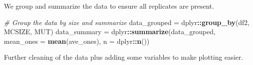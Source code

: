 \documentclass[]{book}
\newenvironment{Shaded}{\begin{snugshade}}{\end{snugshade}}
\newcommand{\CommentTok}[1]{\textcolor[rgb]{0.56,0.35,0.01}{\textit{#1}}}
\newcommand{\DataTypeTok}[1]{\textcolor[rgb]{0.13,0.29,0.53}{#1}}
\newcommand{\KeywordTok}[1]{\textcolor[rgb]{0.13,0.29,0.53}{\textbf{#1}}}
\newcommand{\NormalTok}[1]{#1}
\newcommand{\OperatorTok}[1]{\textcolor[rgb]{0.81,0.36,0.00}{\textbf{#1}}}
\newcommand{\StringTok}[1]{\textcolor[rgb]{0.31,0.60,0.02}{#1}}
\begin{document}
We group and summarize the data to ensure all replicates are present.

\begin{Shaded}
\begin{Highlighting}[]
\CommentTok{# Group the data by size and summarize}
\NormalTok{data_grouped =}\StringTok{ }\NormalTok{dplyr}\OperatorTok{::}\KeywordTok{group_by}\NormalTok{(df2, MCSIZE, MUT)}
\NormalTok{data_summary =}\StringTok{ }\NormalTok{dplyr}\OperatorTok{::}\KeywordTok{summarize}\NormalTok{(data_grouped, }\DataTypeTok{mean_ones =} \KeywordTok{mean}\NormalTok{(ave_ones), }\DataTypeTok{n =}\NormalTok{ dplyr}\OperatorTok{::}\KeywordTok{n}\NormalTok{())}
\end{Highlighting}
\end{Shaded}

Further cleaning of the data plus adding some variables to make plotting easier.
\end{document}
